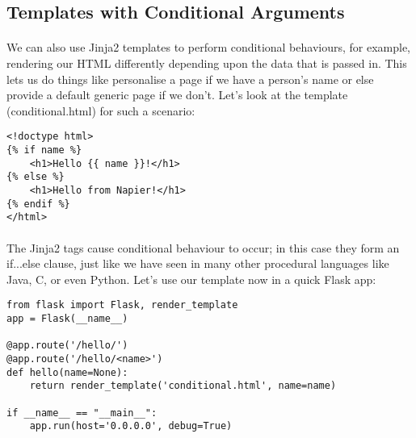 \documentclass[12pt, a4paper, twoside]{book}
\begin{document}
\subsection{Templates with Conditional Arguments}
\label{templates-conditional}
\paragraph{} We can also use Jinja2 templates to perform conditional behaviours, for example, rendering our HTML differently depending upon the data that is passed in. This lets us do things like personalise a page if we have a person's name or else provide a default generic page if we don't. Let's look at the template (conditional.html) for such a scenario:

\begin{lstlisting}
<!doctype html>
{% if name %}
    <h1>Hello {{ name }}!</h1>
{% else %}
    <h1>Hello from Napier!</h1>
{% endif %}
</html>
\end{lstlisting}

\paragraph{} The Jinja2 tags cause conditional behaviour to occur; in this case they form an if...else clause, just like we have seen in many other procedural languages like Java, C, or even Python. Let's use our template now in a quick Flask app:

\begin{lstlisting}
from flask import Flask, render_template
app = Flask(__name__)

@app.route('/hello/')
@app.route('/hello/<name>')
def hello(name=None):
    return render_template('conditional.html', name=name)

if __name__ == "__main__":
    app.run(host='0.0.0.0', debug=True)
\end{lstlisting}
\end{document}
